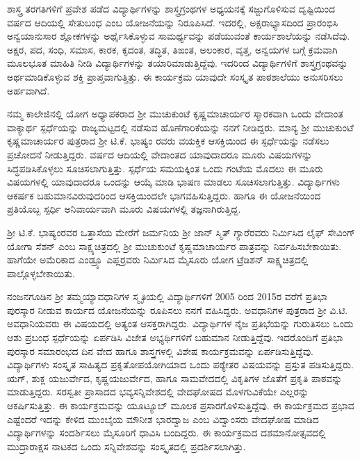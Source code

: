 {ಶಾಸ್ತ್ರ ತರಗತಿಗಳಿಗೆ ಪ್ರವೇಶ ಪಡೆದ ವಿದ್ಯಾರ್ಥಿಗಳನ್ನು ಶಾಸ್ತ್ರಗ್ರಂಥಗಳ ಅಧ್ಯಯ\-ನಕ್ಕೆ ಸಜ್ಜುಗೊಳಿಸುವ ದೃಷ್ಟಿಯಿಂದ ವರ್ಷದ ಆದಿಯಲ್ಲಿ ಸೇತುಬಂಧ ಎಂಬ ಯೋಜನೆ\-ಯನ್ನು ನಿರೂಪಿಸಿದೆ.  ಇದರಲ್ಲಿ, ಅಕ್ಷರಾಭ್ಯಾಸದಿಂದ ಪ್ರಾರಂಭಿಸಿ ಅನ್ವಯಾನು\-ಸಾರ ಶ್ಲೋಕಗಳನ್ನು ಅರ್ಥೈಸಿಕೊಳ್ಳುವ ಸಾಮರ್ಥ್ಯವನ್ನು ಪಡೆಯುವಂತೆ ಕಾರ್ಯಶಾಲೆಯನ್ನು ನಡೆಸಿದೆವು.  ಅಕ್ಷರ, ಪದ, ಸಂಧಿ, ಸಮಾಸ, ಕಾರಕ, ಕೃದಂತ, ತದ್ಧಿತ, ತಿಙಂತ, ಅಲಂಕಾರ, ವೃತ್ತ, ಅನ್ವಯಗಳ ಬಗ್ಗೆ ಕ್ರಮವಾಗಿ ಮೂಲಭೂತ ಮಾಹಿತಿ ನೀಡಿ ವಿದ್ಯಾರ್ಥಿ\-ಗಳನ್ನು ತಯಾರಿಮಾಡುತ್ತಿದ್ದೆವು. ಇದರಿಂದ ವಿದ್ಯಾರ್ಥಿಗಳಿಗೆ ಶಾಸ್ತ್ರಗ್ರಂಥವನ್ನು ಅರ್ಥಮಾಡಿಕೊಳ್ಳುವ ಶಕ್ತಿ ಪ್ರಾಪ್ತವಾಗುತ್ತಿತ್ತು.  ಈ ಕಾರ್ಯಕ್ರಮ ಯಾವುದೇ ಸಂಸ್ಕೃತ ಪಾಠಶಾಲೆಯು ಅನುಸರಿಸಲು ಅರ್ಹವಾಗಿದೆ.  

ನಮ್ಮ ಕಾಲೇಜಿನಲ್ಲಿ ಯೋಗ ಅಧ್ಯಾಪಕರಾದ ಶ್ರೀ ಮುಚುಕುಂಟೆ ಕೃಷ್ಣಮಾ\-ಚಾರ್ಯರ ಸ್ಮಾರಕವಾಗಿ ಒಂದು ವೇದಾಂತ ವಾಕ್ಯಾರ್ಥ ಸ್ಪರ್ಧೆಯನ್ನು ರಾಜ್ಯಮಟ್ಟದಲ್ಲಿ ನಡೆಸುವ ಹೊಣೆಗಾರಿಕೆಯನ್ನು ನನಗೆ ನೀಡಿದ್ದರು.  ಮಾನ್ಯ ಶ್ರೀ ಮುಚುಕುಂಟೆ ಕೃಷ್ಣಮಾಚಾರ್ಯರ ಪುತ್ರರಾದ ಶ್ರೀ ಟಿ.ಕೆ. ಭಾಷ್ಯಂ ರವರು ವಯಕ್ತಿಕ ಆಸಕ್ತಿಯಿಂದ ಈ ಸ್ಪರ್ಧೆಯನ್ನು ನಡೆಸಲು ಪ್ರಚೋದನೆ ನೀಡುತ್ತಿದ್ದರು.  ವರ್ಷದ ಆದಿಯಲ್ಲಿ ವೇದಾಂತದ ಯಾವುದಾದರೂ ಮೂರು ವಿಷಯಗಳನ್ನು ಸಿದ್ಧಪಡಿಸಿಕೊಳ್ಳಲು ಸೂಚಿಸಲಾಗುತ್ತಿತ್ತು.   ಸ್ಪರ್ಧೆಯ ಸಮಯಕ್ಕಿಂತ ಒಂದು ಗಂಟೆಯ ಮೊದಲು ಈ ಮೂರು ವಿಷಯಗಳಲ್ಲಿ ಯಾವುದಾದರೂ ಒಂದನ್ನು ಆಯ್ಕೆ ಮಾಡಿ ಭಾಷಣ ಮಾಡಲು ಸೂಚಿಸಲಾಗುತ್ತಿತ್ತು.  ವಿದ್ಯಾರ್ಥಿಗಳು ಆಕರ್ಷಕ ಬಹುಮಾನವಿರುವುದರಿಂದ ಆಸಕ್ತಿಯಿಂದಲೇ ಭಾಗವಹಿಸುತ್ತಿದ್ದರು.  ಹಾಗೂ ಈ ಯೋಜನೆಯಿಂದ ಪ್ರತಿಯೊಬ್ಬ ಸ್ಪರ್ಧಿ ಅನಿವಾರ್ಯವಾಗಿ ಮೂರು ವಿಷಯಗಳಲ್ಲಿ ತಜ್ಞನಾಗಿರುತ್ತಿದ್ದ.  

ಶ್ರೀ ಟಿ.ಕೆ. ಭಾಷ್ಯಂರವರ ಒತ್ತಾಸೆಯ ಮೇರೆಗೆ ಜರ್ಮನಿಯ ಶ್ರೀ ಜಾನ್ ಸ್ಮಿತ್ ಗ್ಯಾರೆರವರು ನಿರ್ಮಿಸಿದ ಲೈಫ್ ಸೇವಿಂಗ್ ಯೋಗಾ ಸೆಶನ್ ಎಂಬ ಸಾಕ್ಷ್ಯಚಿತ್ರದಲ್ಲಿ ಶ್ರೀ ಮುಚುಕುಂಟೆ ಕೃಷ್ಣಮಾಚಾರ್ಯರ ಪಾತ್ರವನ್ನು ನಿರ್ವಹಿಸಬೇಕಾಯಿತು.  ಹಾಗೆಯೇ ಅಮೆರಿಕಾದ ಎಂಡ್ರ್ಯೂ ಎಪ್ಲರ್‍ರವರು ನಿರ್ಮಿಸಿದ ಮೈಸೂರು ಯೋಗ ಟ್ರೆಡಿಶನ್  ಸಾಕ್ಷ್ಯಚಿತ್ರದಲ್ಲಿ ಪಾಲ್ಗೊಳ್ಳಬೇಕಾಯಿತು. 

ನಂಜನಗೂಡಿನ ಶ್ರೀ ತಮ್ಮಯ್ಯಾವಧಾನಿಗಳ ಸ್ಮೃತಿಯಲ್ಲಿ ವಿದ್ಯಾರ್ಥಿಗಳಿಗೆ 2005 ರಿಂದ 2015ರ ವರೆಗೆ ಪ್ರತಿಭಾ ಪುರಸ್ಕಾರ ನೀಡುವ ಕಾರ್ಯದ ಯೋಜನೆಯನ್ನು ರೂಪಿಸಲು ನನಗೆ ವಹಿಸಿದ್ದರು.  ಅವಧಾನಿಗಳ ಪುತ್ರರಾದ ಶ್ರೀ ವಿ.ಟಿ. ಅವಧಾನಿಯವರು ಈ ವಿಷಯದಲ್ಲಿ ಅತ್ಯಂತ ಆಸಕ್ತರಾಗಿದ್ದರು.  ವಿದ್ಯಾರ್ಥಿಗಳ ನೈಜ ಪ್ರತಿಭೆಯನ್ನು ಗುರುತಿಸಲು ಒಂದು ಆಶು ಪ್ರಬಂಧ ಸ್ಪರ್ಧೆಯನ್ನು ಏರ್ಪಡಿಸಿ ವಿಜೇತ ಅಭ್ಯರ್ಥಿ\-ಗಳಿಗೆ ಬಹುಮಾನ ನೀಡುತ್ತಿದ್ದೆವು.  ಇದರೊಂದಿಗೆ ಪ್ರತಿಭಾ ಪುರಸ್ಕಾರ ಸಮಾರಂಭದ ದಿನ ವೇದ ಹಾಗೂ ಶಾಸ್ತ್ರಗಳಲ್ಲಿ ವಿಶೇಷ ಕಾರ್ಯಕ್ರಮವನ್ನು ಏರ್ಪಡಿಸುತ್ತಿದ್ದೆವು.  ವಿದ್ಯಾರ್ಥಿ\-ಗಳು ಸಂಸ್ಕೃತ ಸಾಹಿತ್ಯದ ಪ್ರಕೃತೋಪಯೋಗಿಯಾದ ಒಂದು ಪಠ್ಯೇತರ ವಿಷಯವನ್ನು ಪ್ರಸ್ತುತ ಪಡಿಸುತ್ತಿದ್ದರು.  ಋಗ್, ಶುಕ್ಲ ಯಜುರ್ವೇದ, ಕೃಷ್ಣಯಜುರ್ವೇದ, ಹಾಗೂ ಸಾಮವೇದದಲ್ಲಿ ವಿಕೃತಿಗಳ ಜೊತೆಗೆ ಪ್ರಕೃತಿ ಪಾಠವನ್ನು ಮಾಡುತ್ತಿದ್ದರು.  ಸರಸ್ವತೀ ಪ್ರಾಸಾದದ ಭವ್ಯಸನ್ನಿವೇಶದಲ್ಲಿ ವೇದಘೋಷದ ಮೊಳಗುವಿಕೆಯೇ ಎಲ್ಲರನ್ನು ಆಕರ್ಷಿಸುತ್ತಿತ್ತು.  ಈ ಕಾರ್ಯಕ್ರಮವನ್ನು ಯೂಟ್ಯೂಬ್ ಮೂಲಕ ಪ್ರಸಾರಗೊಳಿಸುತ್ತಿದ್ದೆವು.  ಈ ಕಾರ್ಯಕ್ರಮದ ಪ್ರಭಾವ ಎಷ್ಟೆಂದರೆ ಇದನ್ನು ಕೇಳಿದ ಮುಂಬೈಯ ಮೌನೀಶ ಭಾರದ್ವಾಜ ಎಂಬ ವಿದ್ವಾಂಸರು ವೇದಘೋಷ ಮಾಡಿದ ವಿದ್ಯಾರ್ಥಿಗಳನ್ನು ಸಂದರ್ಶಿಸಲು ಮೈಸೂರಿಗೆ ಧಾವಿಸಿ ಬಂದಿದ್ದರು.  ಈ ಕಾರ್ಯಕ್ರಮದ ದಶಮಾನೋತ್ಸವದಲ್ಲಿ  ಮುದ್ರಾರಾಕ್ಷಸ ನಾಟಕದ ಒಂದು ಸನ್ನಿವೇಶವನ್ನು ಸಂಸ್ಕೃತದಲ್ಲಿ ಪ್ರದರ್ಶಿಸಲಾಗಿತ್ತು. 

}
